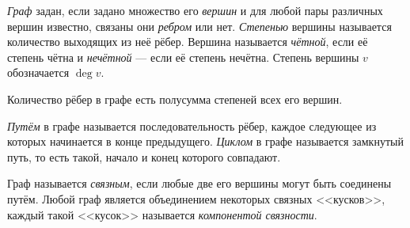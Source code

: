 \resetproblem \begingroup %
    \def\jeolmdate{7 ноября 2018 г.}%
    \def\jeolmauthors{Орлов~О.\,П., Тихонов~Ю.\,В.}%
\jeolmheader \endgroup


 \textit{Граф} задан, если задано множество его \textit{вершин} и для любой пары различных вершин известно, связаны они \textit{ребром} или нет. \textit{Степенью} вершины называется количество выходящих из неё рёбер. Вершина называется \textit{чётной}, если её степень чётна и \textit{нечётной} --- если её степень нечётна. Степень вершины $v$ обозначается $\deg{v}$.

 Количество рёбер в графе есть полусумма степеней всех его вершин.

 \textit{Путём} в графе называется последовательность рёбер, каждое следующее из которых начинается в конце предыдущего. \textit{Циклом} в графе называется замкнутый путь, то есть такой, начало и конец которого совпадают. 

 Граф называется \textit{связным}, если любые две его вершины могут быть соединены путём. Любой граф является объединением некоторых связных <<кусков>>, каждый такой <<кусок>> называется \textit{компонентой связности}. 

